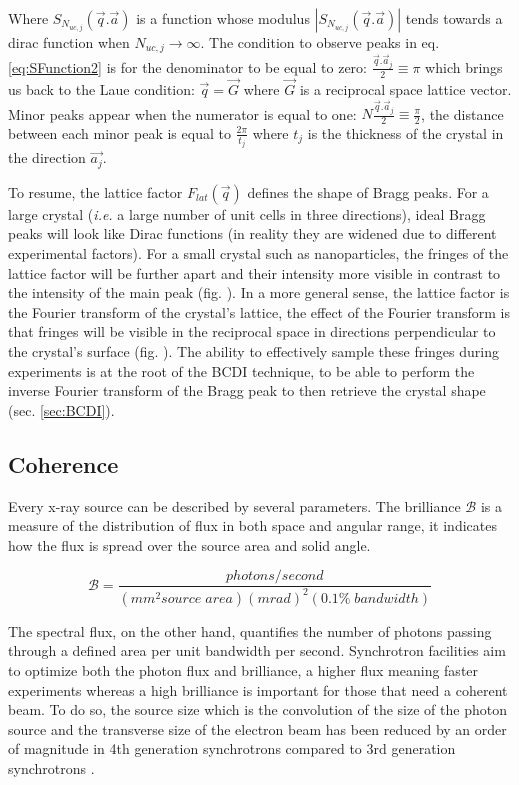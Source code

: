 Where $S_{N_{uc, j}}(\vec{q}.\vec{a})$ is a function whose modulus $|S_{N_{uc, j}}(\vec{q}.\vec{a})|$ tends towards a dirac function when $N_{uc, j} \longrightarrow \infty$.
The condition to observe peaks in eq. \ref{eq:SFunction2} is for the denominator to be equal to zero: $\frac{\vec{q}.\vec{a}_j}{2} \equiv \pi$ which brings us back to the Laue condition: $\vec{q} = \vec{G}$ where $\vec{G}$ is a reciprocal space lattice vector.
Minor peaks appear when the numerator is equal to one: $N\frac{\vec{q}.\vec{a}_j}{2} \equiv \frac{\pi}{2}$, the distance between each minor peak is equal to $\frac{2\pi}{t_j}$ where $t_j$ is the thickness of the crystal in the direction $\vec{a_j}$.

To resume, the lattice factor $F_{lat}(\vec{q})$ defines the shape of Bragg peaks.
For a large crystal (\textit{i.e.} a large number of unit cells in three directions), ideal Bragg peaks will look like Dirac functions (in reality they are widened due to different experimental factors).
For a small crystal such as nanoparticles, the fringes of the lattice factor will be further apart and their intensity more visible in contrast to the intensity of the main peak (fig. ).
In a more general sense, the lattice factor is the Fourier transform of the crystal's lattice, the effect of the Fourier transform is that fringes will be visible in the reciprocal space in directions perpendicular to the crystal's surface (fig. ).
The ability to effectively sample these fringes during experiments is at the root of the BCDI technique, to be able to perform the inverse Fourier transform of the Bragg peak to then retrieve the crystal shape (sec. \ref{sec:BCDI}).


\subsection{Coherence} \label{sec:Coherence}

Every x-ray source can be described by several parameters.
The brilliance $\mathcal{B}$ is a measure of the distribution of flux in both space and angular range, it indicates how the flux is spread over the source area and solid angle.

\begin{equation}
    \mathcal{B} = \frac{photons/second}{(mm^2 source \; area)(mrad)^2(0.1\% \; bandwidth)}
\end{equation}

The spectral flux, on the other hand, quantifies the number of photons passing through a defined area per unit bandwidth per second.
Synchrotron facilities aim to optimize both the photon flux and brilliance, a higher flux meaning faster experiments whereas a high brilliance is important for those that need a coherent beam.
To do so, the source size which is the convolution of the size of the photon source and the transverse size of the electron beam has been reduced by an order of magnitude in 4th generation synchrotrons compared to 3rd generation synchrotrons \parencite{Willmott}.

